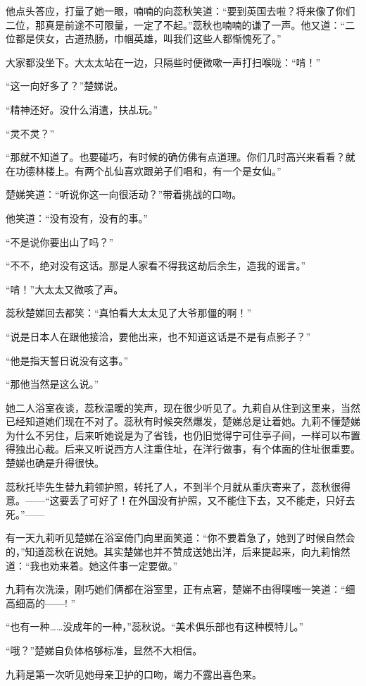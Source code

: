 \par 他点头答应，打量了她一眼，喃喃的向蕊秋笑道：“要到英国去啦？将来像了你们二位，那真是前途不可限量，一定了不起。”蕊秋也喃喃的谦了一声。他又道：“二位都是侠女，古道热肠，巾帼英雄，叫我们这些人都惭愧死了。”
\par 大家都没坐下。大太太站在一边，只隔些时便微嗽一声打扫喉咙：“啃！”
\par “这一向好多了？”楚娣说。
\par “精神还好。没什么消遣，扶乩玩。”
\par “灵不灵？”
\par “那就不知道了。也要碰巧，有时候的确仿佛有点道理。你们几时高兴来看看？就在功德林楼上。有两个乩仙喜欢跟弟子们唱和，有一个是女仙。”
\par 楚娣笑道：“听说你这一向很活动？”带着挑战的口吻。
\par 他笑道：“没有没有，没有的事。”
\par “不是说你要出山了吗？”
\par “不不，绝对没有这话。那是人家看不得我这劫后余生，造我的谣言。”
\par “啃！”大太太又微咳了声。
\par 蕊秋楚娣回去都笑：“真怕看大太太见了大爷那僵的啊！”
\par “说是日本人在跟他接洽，要他出来，也不知道这话是不是有点影子？”
\par “他是指天誓日说没有这事。”
\par “那他当然是这么说。”
\par 她二人浴室夜谈，蕊秋温暖的笑声，现在很少听见了。九莉自从住到这里来，当然已经知道她们现在不对了。蕊秋有时候突然爆发，楚娣总是让着她。九莉不懂楚娣为什么不另住，后来听她说是为了省钱，也仍旧觉得宁可住亭子间，一样可以布置得独出心裁。后来又听说西方人注重住址，在洋行做事，有个体面的住址很重要。楚娣也确是升得很快。
\par 蕊秋托毕先生替九莉领护照，转托了人，不到半个月就从重庆寄来了，蕊秋很得意。——“这要丢了可好了！在外国没有护照，又不能住下去，又不能走，只好去死。”——
\par 有一天九莉听见楚娣在浴室倚门向里面笑道：“你不要着急了，她到了时候自然会的，”知道蕊秋在说她。其实楚娣也并不赞成送她出洋，后来提起来，向九莉悄然道：“我也劝来着。她这件事一定要做。”
\par 九莉有次洗澡，刚巧她们俩都在浴室里，正有点窘，楚娣不由得噗嗤一笑道：“细高细高的——! ”
\par “也有一种……没成年的一种，”蕊秋说。“美术俱乐部也有这种模特儿。”
\par “哦？”楚娣自负体格够标准，显然不大相信。
\par 九莉是第一次听见她母亲卫护的口吻，竭力不露出喜色来。
